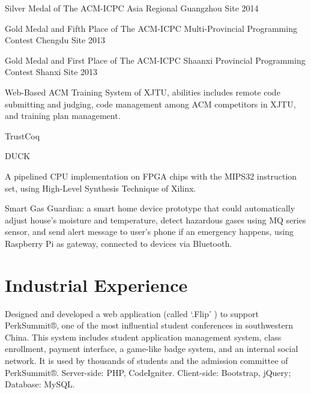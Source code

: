 \documentclass[]{deedy-resume-openfont}
\begin{document}
\begin{tightemize}
\item Silver Medal of The ACM-ICPC Asia Regional Guangzhou Site 2014
\item Gold Medal and Fifth Place of The ACM-ICPC Multi-Provincial Programming Contest Chengdu Site 2013
\item Gold Medal and First Place of The ACM-ICPC Shaanxi Provincial Programming Contest Shanxi Site 2013
\item Web-Based ACM Training System of XJTU, abilities includes remote code submitting and judging, code management among ACM competitors in XJTU, and training plan management.
\end{tightemize}
\sectionsep

\begin{tightemize}
\item TrustCoq
\item DUCK
\item A pipelined CPU implementation on FPGA chips with the MIPS32 instruction set, using High-Level Synthesis Technique of Xilinx.
\item Smart Gas Guardian: a smart home device prototype that could automatically adjust house’s moisture and temperature, detect hazardous gases using MQ series sensor, and send alert message to user’s phone if an emergency happens, using Raspberry Pi as gateway, connected to devices via Bluetooth.
\end{tightemize}



\section{Industrial Experience}
Designed and developed a web application (called ‘.Flip’ ) to support PerkSummit®, one of the most influential student conferences in southwestern China.
This system includes student application management system, class enrollment, payment interface, a game-like badge system, and an internal social network.
It is used by thousands of students and the admission committee of PerkSummit®.
Server-side: PHP, CodeIgniter. Client-side: Bootstrap, jQuery; Database: MySQL.
\sectionsep
\end{document}
